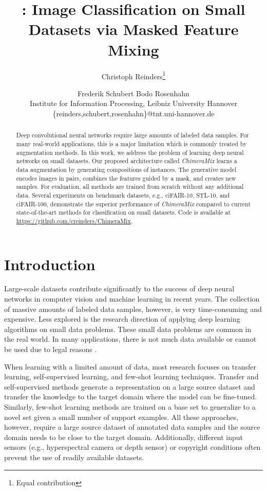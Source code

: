 \documentclass{article}
\title{\methodname: Image Classification on Small Datasets via Masked Feature Mixing}
\author{
Christoph Reinders\footnote{Equal contribution}\and
Frederik Schubert\And
Bodo Rosenhahn\\
\affiliations
Institute for Information Processing, Leibniz University Hannover
\emails
\{reinders,schubert,rosenhahn\}@tnt.uni-hannover.de
}
\newcommand{\methodname}{ChimeraMix\xspace}
\newcommand{\cifairX}{ciFAIR-10\xspace}
\newcommand{\cifairC}{ciFAIR-100\xspace}
\newcommand{\stl}{STL-10\xspace}
\begin{document}
\maketitle

\begin{abstract}
Deep convolutional neural networks require large amounts of labeled data samples. 
For many real-world applications, this is a major limitation which is commonly treated by augmentation methods. 
In this work, we address the problem of learning deep neural networks on small datasets. 
Our proposed architecture called \emph{\methodname} learns a data augmentation by generating compositions of instances. 
The generative model encodes images in pairs, combines the features guided by a mask, and creates new samples.
For evaluation, all methods are trained from scratch without any additional data.
Several experiments on benchmark datasets, e.g., \cifairX, \stl, and \cifairC, demonstrate the superior performance of \emph{\methodname} compared to current state-of-the-art methods for classification on small datasets. 
Code is available at \\\url{https://github.com/creinders/ChimeraMix}.
\end{abstract}

\section{Introduction}
\label{sec:introduction}

Large-scale datasets contribute significantly to the success of deep neural networks in computer vision and machine learning in recent years.
The collection of massive amounts of labeled data samples, however, is very time-consuming and expensive. 
Less explored is the research direction of applying deep learning algorithms on small data problems.
These small data problems are common in the real world.
In many applications, there is not much data available or cannot be used due to legal reasons \cite{renardVariabilityReproducibilityDeep2020}.

When learning with a limited amount of data, most research focuses on transfer learning, self-supervised learning, and few-shot learning techniques. 
Transfer \cite{neyshaburWhatBeingTransferred2020} and self-supervised methods \cite{assranSemiSupervisedLearningVisual2021} generate a representation on a large source dataset and transfer the knowledge to the target domain where the model can be fine-tuned. 
Similarly, few-shot learning methods \cite{kolesnikovBigTransferBiT2020} are trained on a base set to generalize to a novel set given a small number of support examples. 
All these approaches, however, require a large source dataset of annotated data samples and the source domain needs to be close to the target domain.
Additionally, different input sensors (e.g., hyperspectral camera or depth sensor) or copyright conditions often prevent the use of readily available datasets.
\end{document}
